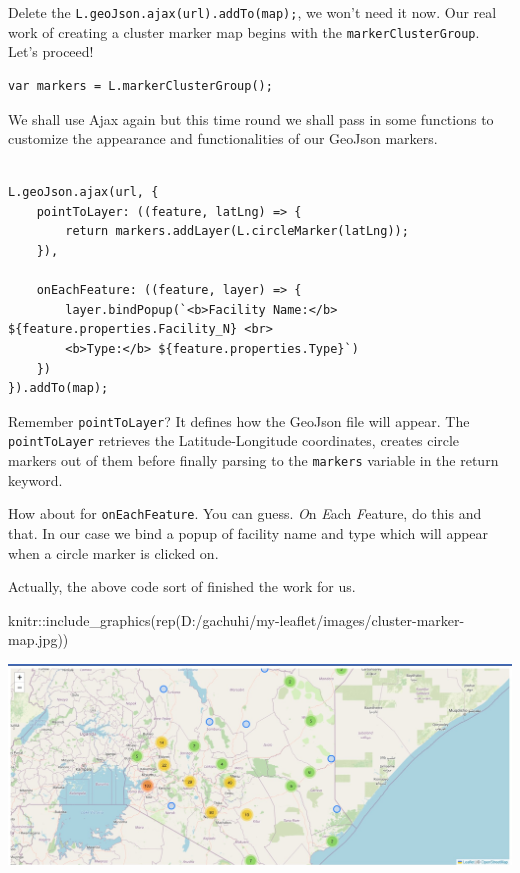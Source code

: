 \documentclass[
]{book}
\newenvironment{Shaded}{\begin{snugshade}}{\end{snugshade}}
\newcommand{\FunctionTok}[1]{\textcolor[rgb]{0.00,0.00,0.00}{#1}}
\newcommand{\NormalTok}[1]{#1}
\newcommand{\SpecialCharTok}[1]{\textcolor[rgb]{0.00,0.00,0.00}{#1}}
\newcommand{\StringTok}[1]{\textcolor[rgb]{0.31,0.60,0.02}{#1}}
\begin{document}
Delete the \texttt{L.geoJson.ajax(url).addTo(map);}, we won't need it now. Our real work of creating a cluster marker map begins with the \texttt{markerClusterGroup}. Let's proceed!

\begin{verbatim}
var markers = L.markerClusterGroup();
\end{verbatim}

We shall use Ajax again but this time round we shall pass in some functions to customize the appearance and functionalities of our GeoJson markers.

\begin{verbatim}

L.geoJson.ajax(url, {
    pointToLayer: ((feature, latLng) => {
        return markers.addLayer(L.circleMarker(latLng));
    }),

    onEachFeature: ((feature, layer) => {
        layer.bindPopup(`<b>Facility Name:</b> ${feature.properties.Facility_N} <br>
        <b>Type:</b> ${feature.properties.Type}`)
    })
}).addTo(map);
\end{verbatim}

Remember \texttt{pointToLayer}? It defines how the GeoJson file will appear. The \texttt{pointToLayer} retrieves the Latitude-Longitude coordinates, creates circle markers out of them before finally parsing to the \texttt{markers} variable in the return keyword.

How about for \texttt{onEachFeature}. You can guess. \emph{O}n \emph{E}ach \emph{F}eature, do this and that. In our case we bind a popup of facility name and type which will appear when a circle marker is clicked on.

Actually, the above code sort of finished the work for us.

\begin{Shaded}
\begin{Highlighting}[]
\NormalTok{knitr}\SpecialCharTok{::}\FunctionTok{include\_graphics}\NormalTok{(}\FunctionTok{rep}\NormalTok{(}\StringTok{\textquotesingle{}D:/gachuhi/my{-}leaflet/images/cluster{-}marker{-}map.jpg\textquotesingle{}}\NormalTok{))}
\end{Highlighting}
\end{Shaded}

\includegraphics[width=26.67in]{../images/cluster-marker-map}
\end{document}
